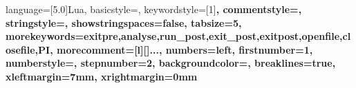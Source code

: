 

 {language={[5.0]Lua},
basicstyle=\small\ttfamily,             %
keywordstyle=[1]\color{Blue}\bfseries,        %
commentstyle=\color{MyDarkGreen}\small,
stringstyle=\color{Purple},             %
showstringspaces=false,                 %
tabsize=5,                              %
%
morekeywords={exitpre,analyse,run_post,exit_post,exitpost,openfile,closefile,PI},
%
%
%
morecomment=[l][\color{Blue}]{...},     %
numbers=left,                           %
firstnumber=1,                          %
numberstyle=\tiny,          %
stepnumber=2,                            %
backgroundcolor=\color{VlightYellow},
breaklines=true,
xleftmargin=7mm,
xrightmargin=0mm
}

